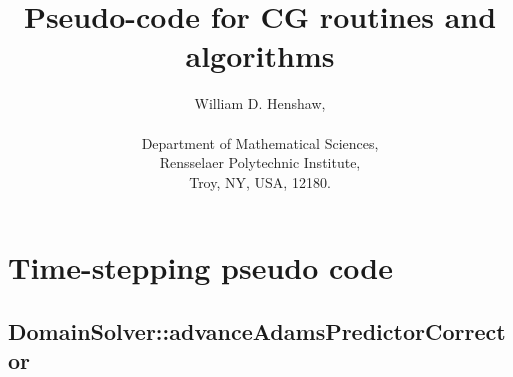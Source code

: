 \documentclass[11pt]{article}
\newcommand{\blue}{\color{blue}}
\newcommand{\red}{\color{red}}
\newcommand{\bfss}{\sffamily\bfseries}
\begin{document}
 
\title{Pseudo-code for CG routines and algorithms}

\author{
William D. Henshaw,\\
 ~\\
Department of Mathematical Sciences, \\
Rensselaer Polytechnic Institute, \\
Troy, NY, USA, 12180.
}
 
\maketitle

\tableofcontents

% 
\newcommand{\bc}[1]{\mbox{\bfss#1}}   %
\newcommand{\cc}[1]{\mbox{$//$  #1}}  %
%
\newcommand{\ia}{\quad}        %
\newcommand{\ib}{\ia\quad}     %
\newcommand{\ic}{\ib\quad}     %
\newcommand{\id}{\ic\quad}     %
\newcommand{\ie}{\id\quad}     %

\newcommand{\FUNC}[1]{{\blue#1}}
\newcommand{\IF}{{\blue if}}
\newcommand{\ELSEIF}{{\blue else if}}
\newcommand{\FOR}{{\blue for}}
\newcommand{\END}{{\blue end}}
\newcommand{\ForDomain}{{\blue ForDomain}}
\newcommand{\COM}[1]{{\red\em #1}}

\clearpage 
\section{Time-stepping pseudo code}

\subsection{DomainSolver::advanceAdamsPredictorCorrector}\label{sec:DomainSolver::advanceAdamsPredictorCorrector}
\end{document}
